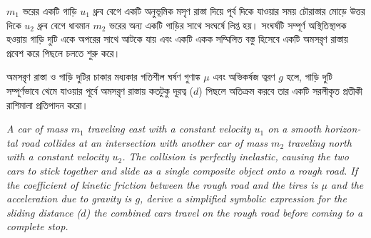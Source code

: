 \documentclass[12pt, a4paper]{article}
\begin{document}
\begin{tcolorbox}[questionbox={প্রশ্ন (Question) 11}]
\noindent
$m_1$ ভরের একটি গাড়ি $u_1$ ধ্রুব বেগে একটি অনুভূমিক মসৃণ রাস্তা দিয়ে পূর্ব দিকে যাওয়ার সময় চৌরাস্তার মোড়ে উত্তর দিকে $u_2$ ধ্রুব বেগে ধাবমান $m_2$ ভরের অন্য একটি গাড়ির সাথে সংঘর্ষে লিপ্ত হয়। সংঘর্ষটি সম্পূর্ণ অস্থিতিস্থাপক হওয়ায় গাড়ি দুটি একে অপরের সাথে আটকে যায় এবং একটি একক সম্মিলিত বস্তু হিসেবে একটি অমসরৃণ রাস্তায় প্রবেশ করে পিছলে চলতে শুরু করে। 

\vspace{0.3em}
\noindent
অমসরৃণ রাস্তা ও গাড়ি দুটির চাকার মধ্যকার গতিশীল ঘর্ষণ গুণাঙ্ক $\mu$ এবং অভিকর্ষজ ত্বরণ $g$ হলে, গাড়ি দুটি সম্পূর্ণভাবে থেমে যাওয়ার পূর্বে অমসরৃণ রাস্তায় কতটুকু দূরত্ব ($d$) পিছলে অতিক্রম করবে তার একটি সরলীকৃত প্রতীকী রাশিমালা প্রতিপাদন করো।

\vspace{0.8em}
\begin{english}
\noindent\textit{\color{darkgray}
A car of mass $m_1$ traveling east with a constant velocity $u_1$ on a smooth horizontal road collides at an intersection with another car of mass $m_2$ traveling north with a constant velocity $u_2$. The collision is perfectly inelastic, causing the two cars to stick together and slide as a single composite object onto a rough road. If the coefficient of kinetic friction between the rough road and the tires is $\mu$ and the acceleration due to gravity is $g$, derive a simplified symbolic expression for the sliding distance ($d$) the combined cars travel on the rough road before coming to a complete stop.
}
\end{english}
\end{tcolorbox}
\end{document}
